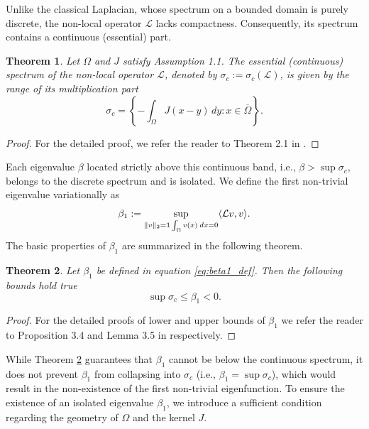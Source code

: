 \documentclass[11pt, a4paper]{article}
\theoremstyle{break}
\newtheorem{thm}{Theorem}[section]
\theoremstyle{break}
\theoremstyle{break}
\theoremstyle{break}
\theoremstyle{break}
\theoremstyle{break}
\theoremstyle{break}
\theoremstyle{break}
\theoremstyle{break}
\begin{document}
Unlike the classical Laplacian, whose spectrum on a bounded domain is purely discrete, the non-local operator $\mathcal{L}$ lacks compactness. Consequently, its spectrum contains a continuous (essential) part.

\begin{thm}
    \label{thm:contninous_spectrum}
    Let $\Omega$ and $J$ satisfy Assumption 1.1. The essential (continuous) spectrum of the non-local operator $\mathcal{L}$, denoted by $\sigma_c := \sigma_c(\mathcal{L})$, is given by the range of its multiplication part
    \begin{equation}
        \sigma_c = \left\{ -\int_\Omega J(x-y) \,dy : x \in \overline{\Omega} \right\}.
    \end{equation}
\end{thm}
\begin{proof}
    For the detailed proof, we refer the reader to Theorem 2.1 in \cite{Tadej2025}.
\end{proof}
Each eigenvalue $\beta$ located strictly above this continuous band, i.e., $\beta > \sup \sigma_c$, belongs to the discrete spectrum and is isolated. We define the first non-trivial eigenvalue variationally as
\begin{equation}\label{eq:beta1_def}
    \beta_1 := \sup_{\|v\|_2 = 1 \\ \int_\Omega v(x) \:dx = 0} \langle \mathcal{L}v, v \rangle.
\end{equation}
The basic properties of $\beta_1$ are summarized in the following theorem.

\begin{thm}
    \label{thm:beta1_bounds}
    Let $\beta_1$ be defined in equation \eqref{eq:beta1_def}. Then the following bounds hold true
    \begin{equation}
        \sup \sigma_c \leq \beta_1 < 0.
    \end{equation}
\end{thm}
\begin{proof}
    For the detailed proofs of lower and upper bounds of $\beta_1$ we refer the reader to Proposition 3.4 and Lemma 3.5 in \cite{AndreuVaillo2010} respectively.
\end{proof}

While Theorem \ref{thm:beta1_bounds} guarantees that $\beta_1$ cannot be below the continuous spectrum, it does not prevent $\beta_1$ from collapsing into $\sigma_c$ (i.e., $\beta_1 = \sup \sigma_c$), which would result in the non-existence of the first non-trivial eigenfunction. To ensure the existence of an isolated eigenvalue $\beta_1$, we introduce a sufficient condition regarding the geometry of $\Omega$ and the kernel $J$.
\end{document}
